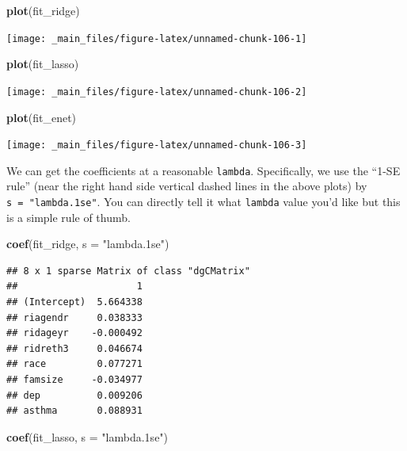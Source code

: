 \documentclass[]{tufte-book}
\newenvironment{Shaded}{}{}
\newcommand{\KeywordTok}[1]{\textcolor[rgb]{0.00,0.44,0.13}{\textbf{#1}}}
\newcommand{\DataTypeTok}[1]{\textcolor[rgb]{0.56,0.13,0.00}{#1}}
\newcommand{\StringTok}[1]{\textcolor[rgb]{0.25,0.44,0.63}{#1}}
\newcommand{\NormalTok}[1]{#1}
\theoremstyle{definition}
\theoremstyle{definition}
\theoremstyle{remark}
\begin{document}
\begin{Shaded}
\begin{Highlighting}[]
\KeywordTok{plot}\NormalTok{(fit_ridge)}
\end{Highlighting}
\end{Shaded}

\texttt{[image: \_main\_files/figure-latex/unnamed-chunk-106-1]}

\begin{Shaded}
\begin{Highlighting}[]
\KeywordTok{plot}\NormalTok{(fit_lasso)}
\end{Highlighting}
\end{Shaded}

\texttt{[image: \_main\_files/figure-latex/unnamed-chunk-106-2]}

\begin{Shaded}
\begin{Highlighting}[]
\KeywordTok{plot}\NormalTok{(fit_enet)}
\end{Highlighting}
\end{Shaded}

\texttt{[image: \_main\_files/figure-latex/unnamed-chunk-106-3]}

We can get the coefficients at a reasonable \texttt{lambda}.
Specifically, we use the ``1-SE rule'' (near the right hand side
vertical dashed lines in the above plots) by
\texttt{s\ =\ "lambda.1se"}. You can directly tell it what
\texttt{lambda} value you'd like but this is a simple rule of thumb.

\begin{Shaded}
\begin{Highlighting}[]
\KeywordTok{coef}\NormalTok{(fit_ridge, }\DataTypeTok{s =} \StringTok{"lambda.1se"}\NormalTok{)}
\end{Highlighting}
\end{Shaded}

\begin{verbatim}
## 8 x 1 sparse Matrix of class "dgCMatrix"
##                     1
## (Intercept)  5.664338
## riagendr     0.038333
## ridageyr    -0.000492
## ridreth3     0.046674
## race         0.077271
## famsize     -0.034977
## dep          0.009206
## asthma       0.088931
\end{verbatim}

\begin{Shaded}
\begin{Highlighting}[]
\KeywordTok{coef}\NormalTok{(fit_lasso, }\DataTypeTok{s =} \StringTok{"lambda.1se"}\NormalTok{)}
\end{Highlighting}
\end{Shaded}
\end{document}
